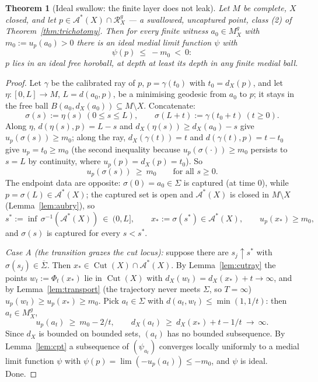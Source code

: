 \documentclass[11pt]{article}
\newtheorem{theorem}{Theorem}[section]
\theoremstyle{remark}
\newcommand{\X}{X}
\newcommand{\Mg}{M^{g}_{\X}}
\newcommand{\Rg}{\mathcal{R}^{g}_{\X}}
\newcommand{\dX}{d_{\X}}
\newcommand{\Cut}{\operatorname{Cut}}
\newcommand{\Aub}{\mathcal{A}^{\ast}}
\begin{document}
\begin{theorem}[Ideal swallow: the finite layer does not leak]
\label{thm:idealswallow}
Let $M$ be complete, $\X$ closed, and let $p\in\Aub(\X)\cap\Rg$ ---
a swallowed, uncaptured point, class \textup{(2)} of
Theorem~\ref{thm:trichotomy}. Then for \emph{every} finite witness
$a_{0}\in\Mg$ with $m_{0}:=u_{p}(a_{0})>0$ there is an \emph{ideal}
medial limit function $\psi$ with
\[
  \psi(p)\ \le\ -m_{0}\ <\ 0 :
\]
$p$ lies in an ideal free horoball, at depth at least its depth in
any finite medial ball.
\end{theorem}

\begin{proof}
Let $\gamma$ be the calibrated ray of $p$, $p=\gamma(t_{0})$ with
$t_{0}=\dX(p)$, and let $\eta:[0,L]\to M$, $L=d(a_{0},p)$, be a
minimising geodesic from $a_{0}$ to $p$; it stays in the free ball
$B(a_{0},\dX(a_{0}))\subseteq M\setminus\X$. Concatenate:
\[
  \sigma(s):=\eta(s)\ (0\le s\le L),\qquad
  \sigma(L+t):=\gamma(t_{0}+t)\ (t\ge0).
\]
Along $\eta$, $d(\eta(s),p)=L-s$ and $\dX(\eta(s))\ge\dX(a_{0})-s$
give $u_{p}(\sigma(s))\ge m_{0}$; along the ray,
$\dX(\gamma(t))=t$ and $d(\gamma(t),p)=t-t_{0}$ give
$u_{p}=t_{0}\ge m_{0}$ (the second inequality because
$u_{p}(\sigma(\cdot))\ge m_{0}$ persists to $s=L$ by continuity,
where $u_{p}(p)=\dX(p)=t_{0}$). So
\begin{equation}\label{eq:sigmamargin}
  u_{p}(\sigma(s))\ \ge\ m_{0}\qquad\text{for all }s\ge0 .
\end{equation}
The endpoint data are opposite: $\sigma(0)=a_{0}\in\Sigma$ is
captured (at time $0$), while $p=\sigma(L)\in\Aub(\X)$; the captured
set is open and $\Aub(\X)$ is closed in $M\setminus\X$
(Lemma~\ref{lem:aubry}), so
\[
  s^{\ast}:=\inf\,\sigma^{-1}(\Aub(\X))\ \in\ (0,L],\qquad
  x_{\ast}:=\sigma(s^{\ast})\in\Aub(\X),\qquad
  u_{p}(x_{\ast})\ge m_{0},
\]
and $\sigma(s)$ is captured for every $s<s^{\ast}$.

\emph{Case A (the transition grazes the cut locus):} suppose there
are $s_{j}\uparrow s^{\ast}$ with
$\sigma(s_{j})\in\overline{\Sigma}$. Then
$x_{\ast}\in\Cut(\X)\cap\Aub(\X)$. By Lemma~\ref{lem:cutray} the
points $w_{t}:=\Phi_{t}(x_{\ast})$ lie in $\Cut(\X)$ with
$\dX(w_{t})=\dX(x_{\ast})+t\to\infty$, and by
Lemma~\ref{lem:transport} (the trajectory never meets $\Sigma$, so
$T=\infty$) $u_{p}(w_{t})\ge u_{p}(x_{\ast})\ge m_{0}$. Pick
$a_{t}\in\Sigma$ with $d(a_{t},w_{t})\le\min(1,1/t)$: then
$a_{t}\in\Mg$,
\[
  u_{p}(a_{t})\ \ge\ m_{0}-2/t,\qquad
  \dX(a_{t})\ \ge\ \dX(x_{\ast})+t-1/t\ \to\ \infty .
\]
Since $\dX$ is bounded on bounded sets, $(a_{t})$ has no bounded
subsequence. By Lemma~\ref{lem:cpt} a subsequence of
$(\psi_{a_{t}})$ converges locally uniformly to a medial limit
function $\psi$ with $\psi(p)=\lim(-u_{p}(a_{t}))\le-m_{0}$, and
$\psi$ is ideal. Done.


\end{proof}
\end{document}

